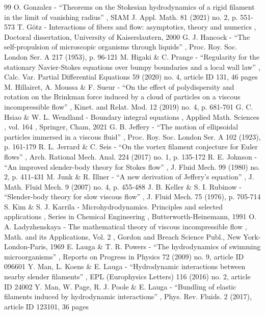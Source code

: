 \documentclass[10pt]{amsart}
\theoremstyle{definition}
\theoremstyle{remark}
\begin{document}
\begin{thebibliography}{99}
 O. Gonzalez - “Theorems on the Stokesian hydrodynamics of a rigid filament in the limit of vanishing radius” , SIAM J. Appl. Math. 81 (2021) no. 2, p. 551-573
 T. Götz - Interactions of fibers and flow: asymptotics, theory and numerics , Doctoral dissertation, University of Kaiserslautern, 2000
 G. J. Hancock - “The self-propulsion of microscopic organisms through liquids” , Proc. Roy. Soc. London Ser. A 217 (1953), p. 96-121
 M. Higaki \& C. Prange - “Regularity for the stationary Navier-Stokes equations over bumpy boundaries and a local wall law” , Calc. Var. Partial Differential Equations 59 (2020) no. 4, article ID 131, 46 pages
 M. Hillairet, A. Moussa \& F. Sueur - “On the effect of polydispersity and rotation on the Brinkman force induced by a cloud of particles on a viscous incompressible flow” , Kinet. and Relat. Mod. 12 (2019) no. 4, p. 681-701
 G. C. Hsiao \& W. L. Wendland - Boundary integral equations , Applied Math. Sciences , vol. 164 , Springer, Cham, 2021
 G. B. Jeffery - “The motion of ellipsoidal particles immersed in a viscous fluid” , Proc. Roy. Soc. London Ser. A 102 (1923), p. 161-179
 R. L. Jerrard \& C. Seis - “On the vortex filament conjecture for Euler flows” , Arch. Rational Mech. Anal. 224 (2017) no. 1, p. 135-172
 R. E. Johnson - “An improved slender-body theory for Stokes flow” , J. Fluid Mech. 99 (1980) no. 2, p. 411-431
 M. Junk \& R. Illner - “A new derivation of Jeffery’s equation” , J. Math. Fluid Mech. 9 (2007) no. 4, p. 455-488
 J. B. Keller \& S. I. Rubinow - “Slender-body theory for slow viscous flow” , J. Fluid Mech. 75 (1976), p. 705-714
 S. Kim \& S. J. Karrila - Microhydrodynamics. Principles and selected applications , Series in Chemical Engineering , Butterworth-Heinemann, 1991
 O. A. Ladyzhenskaya - The mathematical theory of viscous incompressible flow , Math. and its Applications, Vol. 2 , Gordon and Breach Science Publ., New York-London-Paris, 1969
 E. Lauga \& T. R. Powers - “The hydrodynamics of swimming microorganisms” , Reports on Progress in Physics 72 (2009) no. 9, article ID 096601
 Y. Man, L. Koens \& E. Lauga - “Hydrodynamic interactions between nearby slender filaments” , EPL (Europhysics Letters) 116 (2016) no. 2, article ID 24002
 Y. Man, W. Page, R. J. Poole \& E. Lauga - “Bundling of elastic filaments induced by hydrodynamic interactions” , Phys. Rev. Fluids. 2 (2017), article ID 123101, 36 pages

\end{thebibliography}
\end{document}

